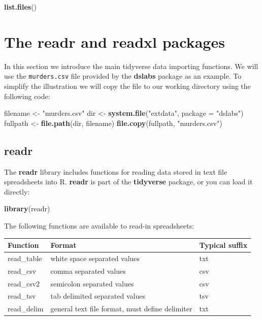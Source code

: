 \documentclass[
]{krantz}
\newenvironment{Shaded}{\begin{snugshade}}{\end{snugshade}}
\newcommand{\DataTypeTok}[1]{\textcolor[rgb]{0.27,0.27,0.27}{#1}}
\newcommand{\KeywordTok}[1]{\textcolor[rgb]{0.27,0.27,0.27}{\textbf{#1}}}
\newcommand{\NormalTok}[1]{#1}
\newcommand{\StringTok}[1]{\textcolor[rgb]{0.5,0.5,0.5}{#1}}
\begin{document}
\begin{Shaded}
\begin{Highlighting}[]
\KeywordTok{list.files}\NormalTok{()}
\end{Highlighting}
\end{Shaded}

\hypertarget{the-readr-and-readxl-packages}{%
\section{The readr and readxl packages}\label{the-readr-and-readxl-packages}}

In this section we introduce the main tidyverse data importing functions. We will use the \texttt{murders.csv} file provided by the \textbf{dslabs} package as an example. To simplify the illustration we will copy the file to our working directory using the following code:

\begin{Shaded}
\begin{Highlighting}[]
\NormalTok{filename <-}\StringTok{ "murders.csv"}
\NormalTok{dir <-}\StringTok{ }\KeywordTok{system.file}\NormalTok{(}\StringTok{"extdata"}\NormalTok{, }\DataTypeTok{package =} \StringTok{"dslabs"}\NormalTok{) }
\NormalTok{fullpath <-}\StringTok{ }\KeywordTok{file.path}\NormalTok{(dir, filename)}
\KeywordTok{file.copy}\NormalTok{(fullpath, }\StringTok{"murders.csv"}\NormalTok{)}
\end{Highlighting}
\end{Shaded}

\hypertarget{readr}{%
\subsection{readr}\label{readr}}

The \textbf{readr} library includes functions for reading data stored in text file spreadsheets into R. \textbf{readr} is part of the \textbf{tidyverse} package, or you can load it directly:

\begin{Shaded}
\begin{Highlighting}[]
\KeywordTok{library}\NormalTok{(readr)}
\end{Highlighting}
\end{Shaded}

The following functions are available to read-in spreadsheets:

\begin{longtable}[]{@{}lll@{}}
\toprule
Function & Format & Typical suffix\tabularnewline
\midrule
\endhead
read\_table & white space separated values & txt\tabularnewline
read\_csv & comma separated values & csv\tabularnewline
read\_csv2 & semicolon separated values & csv\tabularnewline
read\_tsv & tab delimited separated values & tsv\tabularnewline
read\_delim & general text file format, must define delimiter & txt\tabularnewline
\bottomrule
\end{longtable}
\end{document}
